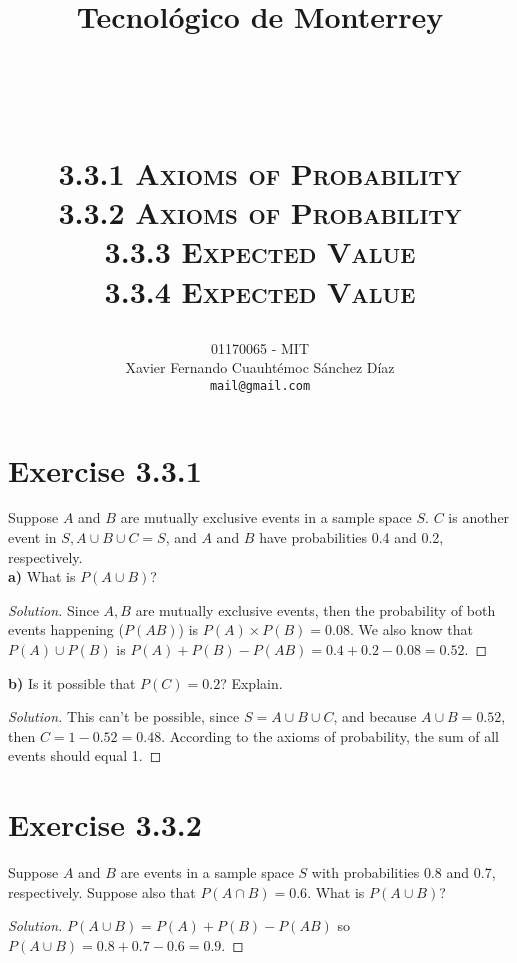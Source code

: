 \documentclass[titlepage, letterpaper, fleqn]{article}
\title{
\vspace{1in}
\textbf{Tecnológico de Monterrey} \\
\vspace{0.5in}
\textmd{\mahclass} \\
\large{\textit{\mahteacher}} \\
\vspace{0.5in}
\textsc{\mahtitle}\\
\textsc{3.3.1 Axioms of Probability}\\
\textsc{3.3.2 Axioms of Probability}\\
\textsc{3.3.3 Expected Value}\\
\textsc{3.3.4 Expected Value}\\
\author{01170065  - MIT \\
Xavier Fernando Cuauhtémoc Sánchez Díaz \\
\texttt{mail@gmail.com}}
\date{\mahdate}
}
\newcommand{\spacepls}{\vspace{5mm}}
\renewcommand\qedsymbol{\(\blacksquare\)}
\newenvironment{solution}
{\renewcommand\qedsymbol{$\square$}\begin{proof}[Solution]}
{\end{proof}}
\begin{document}
\begin{titlepage}
\maketitle
\end{titlepage}

%
%

\section{Exercise 3.3.1}

{\large Suppose \(A\) and \(B\) are mutually exclusive events in a sample space \(S\). \(C\) is another event in \(S, A \cup B \cup C = S\), and \(A\) and \(B\) have probabilities 0.4 and 0.2, respectively.\\
\textbf{a)} What is \(P(A \cup B)\)?}

\begin{solution}
Since \(A,B\) are mutually exclusive events, then the probability of both events happening (\(P(AB)\)) is \(P(A) \times P(B) = 0.08\).
We also know that \(P(A) \cup P(B)\) is \(P(A) + P(B) - P(AB) = 0.4 + 0.2 - 0.08 = 0.52\).
\end{solution}

\spacepls

{\large \textbf{b)} Is it possible that \(P(C) = 0.2\)? Explain.}

\begin{solution}
This can't be possible, since \(S = A \cup B \cup C\), and because \(A \cup B = 0.52\), then \(C = 1 - 0.52 = 0.48\). According to the axioms of probability, the sum of all events should equal 1.
\end{solution}

\spacepls

\section{Exercise 3.3.2}

{\large Suppose \(A\) and \(B\) are events in a sample space \(S\) with probabilities 0.8 and 0.7, respectively. Suppose also that \(P(A \cap B) = 0.6\). What is \(P(A \cup B)\)?}

\begin{solution}
\(P(A \cup B) = P(A) + P(B) - P(AB)\) so  \(P(A \cup B) = 0.8 + 0.7 - 0.6 = 0.9\).
\end{solution}

\spacepls
\end{document}
